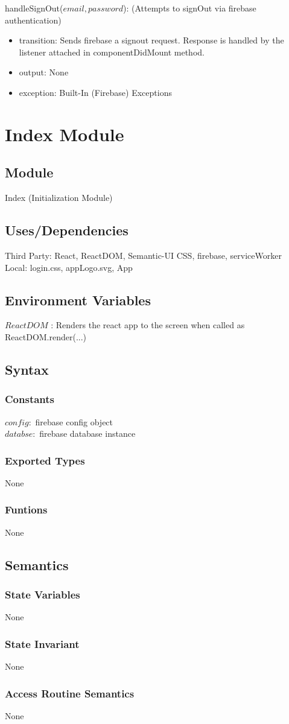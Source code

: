 \documentclass[12pt, titlepage]{article}
\begin{document}
handleSignOut($email, password$): (Attempts to signOut via firebase authentication)
\begin{itemize}
\item transition: Sends firebase a signout request. Response is handled by the listener attached in componentDidMount method.
\item output: None 
\item exception: Built-In (Firebase) Exceptions
\end{itemize}
\newpage


\section* {Index Module}

\subsection*{Module}

Index (Initialization Module)

\subsection* {Uses/Dependencies}
Third Party: React, ReactDOM, Semantic-UI CSS, firebase, serviceWorker\\
Local: login.css, appLogo.svg, App
\subsection*{Environment Variables}
$ReactDOM$ : Renders the react app to the screen when called as ReactDOM.render(...)
\subsection* {Syntax}
\subsubsection* {Constants} 
$config:$ firebase config object \\
$databse:$ firebase database instance
\subsubsection* {Exported Types} None
\subsubsection* {Funtions}
None
\subsection* {Semantics}

\subsubsection* {State Variables}
None
\subsubsection* {State Invariant}
None

\subsubsection* {Access Routine Semantics}
None
\end{document}
